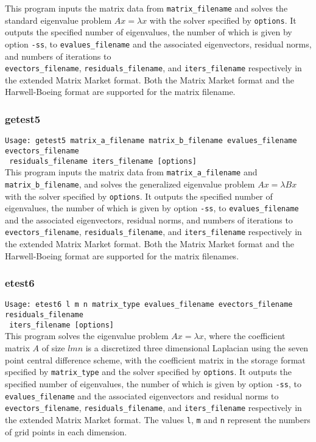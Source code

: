 \documentclass[a4paper]{article}
\begin{document}
This program inputs the matrix data from {\tt matrix\_filename} and
solves the standard eigenvalue problem $Ax=\lambda x$ with
the solver specified by {\tt options}. 
It outputs the specified number of eigenvalues,
the number of which is given by option \verb|-ss|, to 
{\tt evalues\_filename} and the associated 
eigenvectors, residual norms, and numbers of iterations  
to \\ {\tt evectors\_filename}, {\tt residuals\_filename}, 
and {\tt iters\_filename} respectively in the extended 
Matrix Market format.
Both the Matrix Market format and the Harwell-Boeing format are
supported for the matrix filename. 

\subsubsection{getest5}

\verb+Usage: getest5 matrix_a_filename matrix_b_filename evalues_filename evectors_filename +\\
\verb+ residuals_filename iters_filename [options] +\\

This program inputs the matrix data from {\tt matrix\_a\_filename} and
{\tt matrix\_b\_filename}, and solves the generalized eigenvalue problem
$Ax=\lambda Bx$ with the solver specified by {\tt options}. 
It outputs the specified number of eigenvalues,
the number of which is given by option \verb|-ss|, to 
{\tt evalues\_filename} and the associated 
eigenvectors, residual norms, and numbers of iterations  
to \\ {\tt evectors\_filename}, {\tt residuals\_filename}, 
and {\tt iters\_filename} respectively in the extended 
Matrix Market format.  
Both the Matrix Market format and the Harwell-Boeing format are
supported for the matrix filenames. 

\subsubsection{etest6}

\verb+Usage: etest6 l m n matrix_type evalues_filename evectors_filename residuals_filename +\\
\verb+ iters_filename [options] +\\

This program solves the eigenvalue problem $Ax = \lambda x$, where the 
coefficient matrix $A$ of size $lmn$ is a discretized three dimensional Laplacian using the seven
point central difference scheme, with the coefficient matrix in the storage format specified
by \verb|matrix_type| and the solver specified by {\tt options}. 
It outputs the specified number of eigenvalues,
the number of which is given by option \verb|-ss|, to 
{\tt evalues\_filename} and the associated 
eigenvectors and residual norms to {\tt evectors\_filename},  
{\tt residuals\_filename}, and {\tt iters\_filename} respectively 
in the extended Matrix Market format.
The values {\tt l}, {\tt m} and {\tt n} represent the numbers of grid
points in each dimension.
\end{document}

